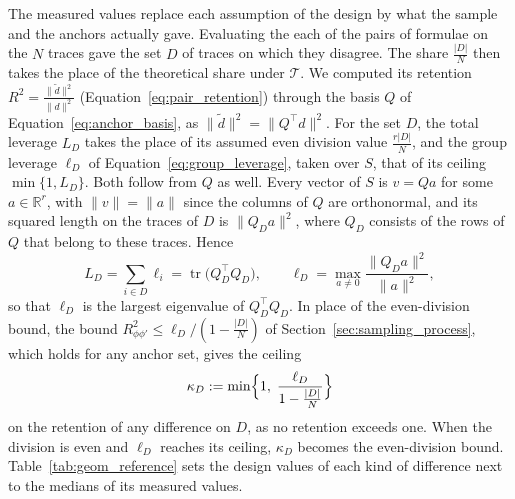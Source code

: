 \documentclass[titlepage,a4paper,11pt]{report}
\begin{document}
    The measured values replace each assumption of the design by what the sample and the anchors actually gave. Evaluating the each of the pairs of formulae on the $N$ traces gave the set $D$ of traces on which they disagree. The share $\frac{|D|}{N}$ then takes the place of the theoretical share under $\mathcal T$. We computed its retention $R^2=\frac{\lVert\tilde d\rVert^2}{\lVert d\rVert^2}$ (Equation~\eqref{eq:pair_retention}) through the basis $Q$ of Equation~\eqref{eq:anchor_basis}, as $\lVert\tilde d\rVert^2=\lVert Q^\top d\rVert^2$. For the set $D$, the total leverage $L_D$ takes the place of its assumed even division value $\frac{r|D|}{N}$, and the group leverage $\ell_D$ of Equation~\eqref{eq:group_leverage}, taken over $S$, that of its ceiling $\min\{1,L_D\}$. Both follow from $Q$ as well. Every vector of $S$ is $v=Qa$ for some $a\in\mathbb R^r$, with $\lVert v\rVert=\lVert a\rVert$ since the columns of $Q$ are orthonormal, and its squared length on the traces of $D$ is $\lVert Q_Da\rVert^2$, where $Q_D$ consists of the rows of $Q$ that belong to these traces. Hence
    \begin{equation}\label{eq:leverage_blocks}
        L_D=\sum_{i\in D}\ell_i=\operatorname{tr}\bigl(Q_D^\top Q_D\bigr),
        \qquad
        \ell_D=\max_{a\neq0}\frac{\lVert Q_Da\rVert^2}{\lVert a\rVert^2},
    \end{equation}
    so that $\ell_D$ is the largest eigenvalue of $Q_D^\top Q_D$. In place of the even-division bound, the bound $R^2_{\phi\phi'}\le\ell_D/(1-\frac{|D|}{N})$ of Section~\ref{sec:sampling_process}, which holds for any anchor set, gives the ceiling
    \begin{equation}\label{eq:retention_ceiling}
        \kappa_D:=\min\Bigl\{1,\;\frac{\ell_D}{1-\frac{|D|}{N}}\Bigr\}
    \end{equation}
    on the retention of any difference on $D$, as no retention exceeds one. When the division is even and $\ell_D$ reaches its ceiling, $\kappa_D$ becomes the even-division bound. Table~\ref{tab:geom_reference} sets the design values of each kind of difference next to the medians of its measured values.
\end{document}
